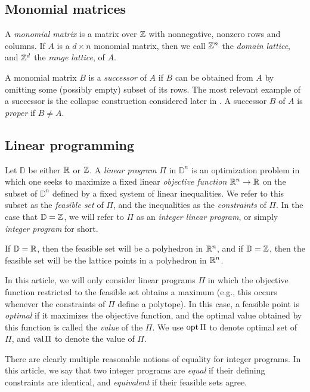 \documentclass[11pt]{amsart}
\begin{document}
\subsection{Monomial matrices}  A \emph{monomial matrix} is a matrix over $\mathbb{Z}$ with nonnegative, nonzero rows and columns.   If $A$ is a $d \times n$ monomial matrix, then we call $\mathbb{Z}^n$ the \emph{domain lattice}, and $\mathbb{Z}^d$ the \emph{range lattice}, of $A$.

A  monomial matrix $B$ is a \emph{successor} of $A$ if $B$ can be obtained from $A$ by omitting some (possibly empty) subset of its rows.   The most relevant example of a successor is the collapse construction considered later in .  A successor $B$ of $A$ is  \emph{proper} if $B \neq A$. 


\subsection{Linear programming}  

Let $\mathbb{D}$ be either $\mathbb{R}$ or $\mathbb{Z}$.  A \emph{linear program} $\Pi$ in $\mathbb{D}^n$ is an optimization problem in which one seeks to maximize a fixed linear \emph{objective function} $\mathbb{R}^n \to \mathbb{R}$ on the subset of $\mathbb{D}^n$ defined by a fixed system of linear inequalities.  We refer to this subset as the \emph{feasible set} of $\Pi$, and the inequalities as the \emph{constraints} of $\Pi$.  In the case that $\mathbb{D} = \mathbb{Z}$, we will refer to $\Pi$ as an \emph{integer linear program}, or simply \emph{integer program} for short.  

If $\mathbb{D} = \mathbb{R}$, then the feasible set  will be a polyhedron in $\mathbb{R}^n$, and if $\mathbb{D} = \mathbb{Z}$, then the feasible set will be the lattice points in a polyhedron in $\mathbb{R}^n$.  

In this article, we will only consider linear programs $\Pi$ in which the objective function restricted to the feasible set obtains a maximum (e.g., this occurs whenever the constraints of $\Pi$ define a polytope).  In this case, a feasible point is \emph{optimal} if it maximizes the objective function, and the optimal value obtained by this function is called the \emph{value} of the $\Pi$.  We use $\operatorname{opt} \Pi$ to denote optimal set of $\Pi$, and $\operatorname{val} \Pi$ to denote the value of $\Pi$. 

There are clearly multiple reasonable notions of equality for integer programs.  In this article,  we say that two integer programs are \emph{equal} if their defining constraints are identical, and \emph{equivalent} if their feasible sets agree. 
\end{document}
